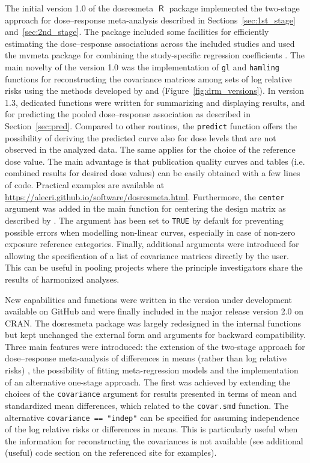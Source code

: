 \documentclass[11pt,a4paper,twoside,openany]{book}\usepackage{knitr}
\newcommand{\pkg}[1]{{\fontseries{b}\selectfont #1}}
\DeclareMathOperator{\R}{\textsf{R}}
\begin{document}
{{The initial version 1.0 of the \pkg{dosresmeta} $\R$ package implemented the two-stage approach for dose--response meta-analysis described in Sections~\ref{sec:1st_stage} and~\ref{sec:2nd_stage}. The package included some facilities for efficiently estimating the dose--response associations across the included studies and used the \pkg{mvmeta} package for combining the study-specific regression coefficients \citep{gasparrini2012multivariate}. The main novelty of the version 1.0 was the implementation of \texttt{gl} and \texttt{hamling} functions for reconstructing the covariance matrices among sets of log relative risks using the methods developed by \cite{greenland1992methods} and \cite{hamling2008facilitating} (Figure~\ref{fig:drm_versions}). 
In version 1.3, dedicated functions were written for summarizing and displaying results, and for predicting the pooled dose--response association as described in Section~\ref{sec:pred}. Compared to other routines, the \texttt{predict} function offers the possibility of deriving the predicted curve also for dose levels that are not observed in the analyzed data. The same applies for the choice of the reference dose value. The main advantage is that publication quality curves and tables (i.e. combined results for desired dose values) can be easily obtained with a few lines of code. Practical examples are available at \url{https://alecri.github.io/software/dosresmeta.html}.
Furthermore, the \texttt{center} argument was added in the main function for centering the design matrix as described by \cite{liu2009two}. The argument has been set to \texttt{TRUE} by default for preventing possible errors when modelling non-linear curves, especially in case of non-zero exposure reference categories. Finally, additional arguments were introduced for allowing the specification of a list of covariance matrices directly by the user. This can be useful in pooling projects where the principle investigators share the results of harmonized analyses.

\noindent New capabilities and functions were written in the version under development available on GitHub and were finally included in the major release version 2.0 on CRAN. The \pkg{dosresmeta} package was largely redesigned in the internal functions but kept unchanged the external form and arguments for backward compatibility. Three main features were introduced: the extension of the two-stage approach for dose--response meta-analysis of differences in means (rather than log relative risks) \citep{crippa2016dose}, the  possibility of fitting meta-regression models and the implementation of an alternative one-stage approach. The first was achieved by extending the choices of the \texttt{covariance} argument for results presented in terms of mean and standardized mean differences, which related to the \texttt{covar.smd} function. The alternative \texttt{covariance == "indep"} can be specified for assuming independence of the log relative risks or differences in means. This is particularly useful when the information for reconstructing the covariances is not available (see additional (useful) code section on the referenced site for examples).

}}
\end{document}
